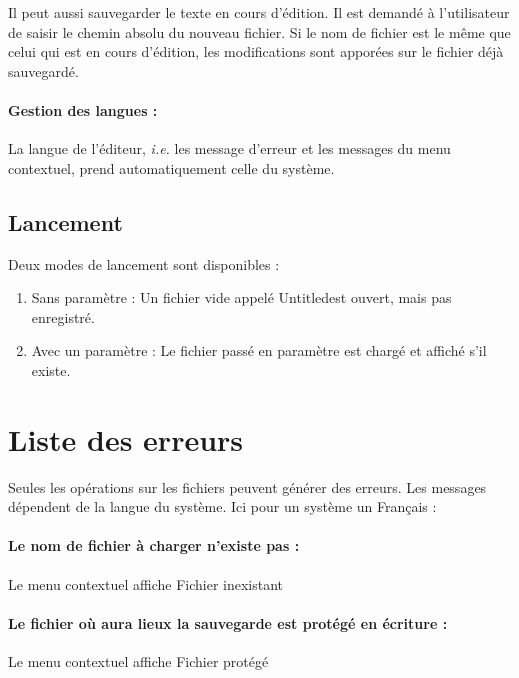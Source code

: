 Il peut aussi sauvegarder le texte en cours d'édition. Il est demandé à l'utilisateur de saisir le chemin absolu du nouveau fichier. Si le nom de fichier est le même que celui qui est en cours d'édition, les modifications sont apporées sur le fichier déjà sauvegardé.

\paragraph{Gestion des langues :}
La langue de l'éditeur, \textsl{i.e.} les message d'erreur et les messages du menu contextuel, prend automatiquement celle du système.

\subsection{Lancement}
Deux modes de lancement sont disponibles :
\begin{enumerate}
	\item Sans paramètre : Un fichier vide appelé \og Untitled\fg est ouvert, mais pas enregistré.
	\item Avec un paramètre : Le fichier passé en paramètre est chargé et affiché s'il existe.
\end{enumerate}

\section{Liste des erreurs}
Seules les opérations sur les fichiers peuvent générer des erreurs. Les messages dépendent de la langue du système. Ici pour un système un Français :

\paragraph{Le nom de fichier à charger n'existe pas :} Le menu contextuel affiche \og Fichier inexistant\fg
\paragraph{Le fichier où aura lieux la sauvegarde est protégé en écriture :} Le menu contextuel affiche \og Fichier protégé\fg

